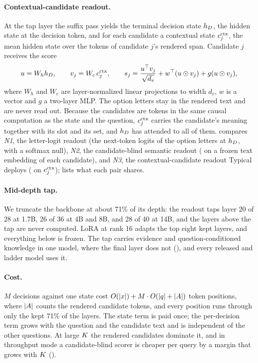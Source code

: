 \paragraph{Contextual-candidate readout.}
\label{sec:method:readout}
At the tap layer the suffix pass yields the terminal decision state $h_D$, the hidden state at the
decision token, and for each candidate a contextual state $c^{\mathrm{ctx}}_{j}$, the mean hidden state over the
tokens of candidate $j$'s rendered span. Candidate $j$ receives the score
\begin{equation}
  u = W_h h_D, \qquad v_j = W_c\, c^{\mathrm{ctx}}_{j}, \qquad
  s_j = \frac{u^{\top} v_j}{\sqrt{d_v}} + w^{\top}(u \odot v_j) + g(u \odot v_j),
  \label{eq:readout}
\end{equation}
where $W_h$ and $W_c$ are layer-normalized linear projections to width $d_v$, $w$ is a vector and $g$ a
two-layer MLP. The option letters stay in the rendered text and are never read out. Because the
candidates are tokens in the same causal computation as the state and the question, $c^{\mathrm{ctx}}_{j}$ carries the
candidate's meaning together with its slot and its set, and $h_D$ has attended to all of them.
 compares \emph{N1}, the letter-logit readout (the next-token logits of the
option letters at $h_D$, with a softmax null), \emph{N2}, the candidate-blind semantic readout
( on a frozen text embedding of each candidate), and \emph{N3}, the contextual-candidate
readout Typical deploys ( on $c^{\mathrm{ctx}}_{j}$);  lists what each pair
shares.

\paragraph{Mid-depth tap.}
\label{sec:method:depth}
We truncate the backbone at about 71\% of its depth: the readout taps layer 20 of 28 at 1.7B, 26 of 36 at
4B and 8B, and 28 of 40 at 14B, and the layers above the tap are never computed. LoRA \citep{hu2022lora}
at rank 16 adapts the top eight kept layers, and everything below is frozen. The tap carries evidence and
question-conditioned knowledge in one model, where the final layer does not (),
and every released and ladder model uses it.

\paragraph{Cost.}
\label{sec:method:cost}
$M$ decisions against one state cost $O(|x|) + M \cdot O(|q| + |A|)$ token positions, where
$|A|$ counts the rendered candidate tokens, and every position runs through only the kept 71\% of the
layers. The state term is paid once; the per-decision term grows with the question and the candidate text
and is independent of the other questions. At large $K$ the rendered candidates dominate it, and
in throughput mode a candidate-blind scorer is cheaper per query by a margin that grows with $K$
().

